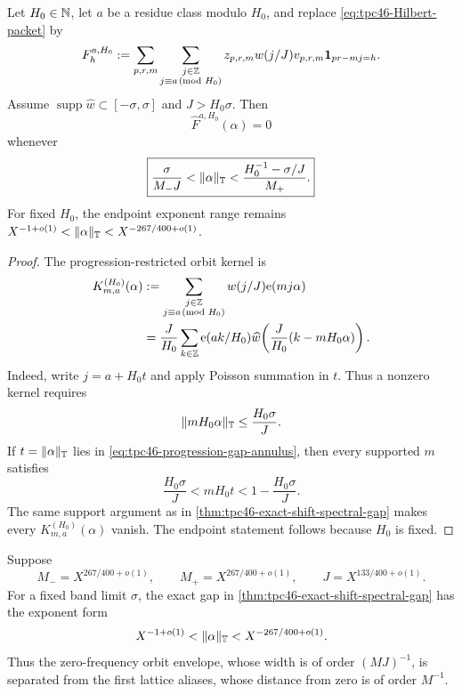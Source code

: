 \begin{corollary}
\label{cor:tpc46-progression-shift-gap}
Let \(H_0\in\mathbb N\), let \(a\) be a residue class modulo \(H_0\), and
replace \eqref{eq:tpc46-Hilbert-packet} by
\begin{equation}
 F_h^{a,H_0}
 :=\sum_{p,r,m}\sum_{\substack{j\in\mathbb Z\\j\equiv a\!\!\pmod{H_0}}}
 z_{p,r,m}w(j/J)v_{p,r,m}\mathbf 1_{pr-mj=h}.
 \label{eq:tpc46-progression-Hilbert-packet}
\end{equation}
Assume
\(\operatorname{supp}\widehat w\subset[-\sigma,\sigma]\) and
\(J>H_0\sigma\).  Then
\begin{equation}
 \widehat F^{a,H_0}(\alpha)=0
 \label{eq:tpc46-progression-gap-vanishing}
\end{equation}
whenever
\begin{equation}
 \boxed{
 \frac{\sigma}{M_-J}
 <\|\alpha\|_{\mathbb T}<
 \frac{H_0^{-1}-\sigma/J}{M_+}.}
 \label{eq:tpc46-progression-gap-annulus}
\end{equation}
For fixed \(H_0\), the endpoint exponent range remains
\(X^{-1+o(1)}<\|\alpha\|_{\mathbb T}<X^{-267/400+o(1)}\).
\end{corollary}

\begin{proof}
The progression-restricted orbit kernel is
\begin{align}
 K_{m,a}^{(H_0)}(\alpha)
 &:=
 \sum_{\substack{j\in\mathbb Z\\j\equiv a\!\!\pmod{H_0}}}
 w(j/J)\mathrm e(mj\alpha)\notag\\
 &=\frac{J}{H_0}\sum_{k\in\mathbb Z}
 \mathrm e(ak/H_0)
 \widehat w\!\left(
 \frac{J}{H_0}(k-mH_0\alpha)
 \right).
 \label{eq:tpc46-progression-orbit-kernel}
\end{align}
Indeed, write \(j=a+H_0t\) and apply Poisson summation in \(t\).
Thus a nonzero kernel requires
\[
 \|mH_0\alpha\|_{\mathbb T}\le\frac{H_0\sigma}{J}.
\]
If \(t=\|\alpha\|_{\mathbb T}\) lies in
\eqref{eq:tpc46-progression-gap-annulus}, then every supported \(m\)
satisfies
\[
 \frac{H_0\sigma}{J}<mH_0t<1-\frac{H_0\sigma}{J}.
\]
The same support argument as in
\cref{thm:tpc46-exact-shift-spectral-gap} makes every
\(K_{m,a}^{(H_0)}(\alpha)\) vanish.  The endpoint statement follows
because \(H_0\) is fixed.
\end{proof}

\begin{corollary}
\label{cor:tpc46-endpoint-shift-gap}
Suppose
\begin{equation}
 M_-=X^{267/400+o(1)},\qquad
 M_+=X^{267/400+o(1)},\qquad
 J=X^{133/400+o(1)}.
 \label{eq:tpc46-endpoint-MJ-scales}
\end{equation}
For a fixed band limit \(\sigma\), the exact gap in
\cref{thm:tpc46-exact-shift-spectral-gap} has the exponent form
\begin{equation}
 X^{-1+o(1)}
 <\|\alpha\|_{\mathbb T}<
 X^{-267/400+o(1)}.
 \label{eq:tpc46-endpoint-frequency-gap}
\end{equation}
Thus the zero-frequency orbit envelope, whose width is of order
\((MJ)^{-1}\), is separated from the first lattice aliases, whose
distance from zero is of order \(M^{-1}\).
\end{corollary}


